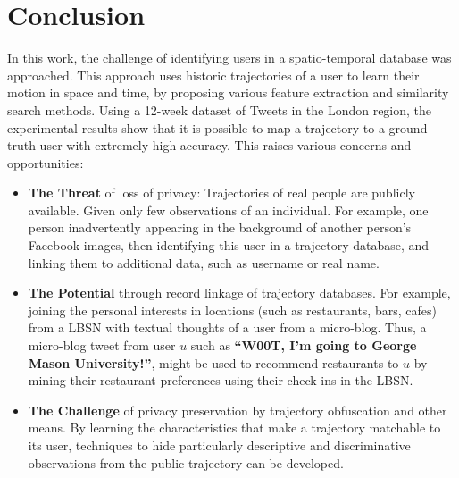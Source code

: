 
\chapter[Conclusion]{Conclusion}
\label{sec:conclusion}
In this work, the challenge of identifying users in a spatio-temporal database was approached. This approach uses historic trajectories of a user to learn their motion in space and time, by proposing various feature extraction and similarity search methods. Using a 12-week dataset of Tweets in the London region, the experimental results show that it is possible to map a trajectory to a ground-truth user with extremely high accuracy. This raises various concerns and opportunities:
\begin{itemize}
  \item {\bf The Threat} of loss of privacy: Trajectories of real people are publicly available. Given only few observations of an individual. For example, one person inadvertently appearing in the background of another person's Facebook images, then identifying this user in a trajectory database, and linking them to additional data, such as username or real name.
  \item {\bf The Potential} through record linkage of trajectory databases. For example, joining the personal interests in locations (such as restaurants, bars, cafes) from a LBSN with textual thoughts of a user from a micro-blog. Thus, a micro-blog tweet from user $u$ such as {\bf ``W00T, I'm going to George Mason University!''}, might be used to recommend restaurants to $u$ by mining their restaurant preferences using their check-ins in the LBSN.
  \item {\bf The Challenge} of privacy preservation by trajectory obfuscation and other means. By learning the characteristics that make a trajectory matchable to its user, techniques to hide particularly descriptive and discriminative observations from the public trajectory can be developed.
\end{itemize}
